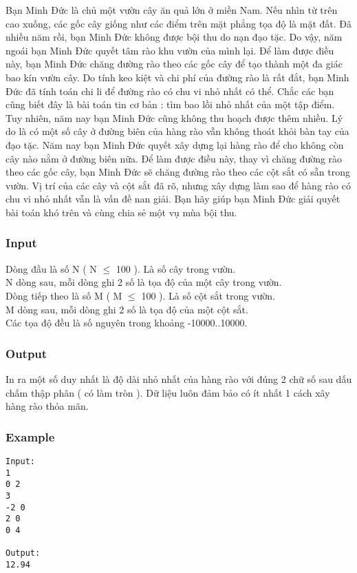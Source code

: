 



   Bạn Minh Đức là chủ một vườn cây ăn quả lớn ở miền Nam. Nếu nhìn từ trên cao xuống, các gốc cây giống như các điểm trên mặt phẳng tọa độ là mặt đất. Đã nhiều năm rồi, bạn Minh Đức không được bội thu do nạn đạo tặc. Do vậy, năm ngoái bạn Minh Đức quyết tâm rào khu vườn của mình lại. Để làm được điều này, bạn Minh Đức chăng đường rào theo các gốc cây để tạo thành một đa giác bao kín vườn cây. Do tính keo kiệt và chi phí của đường rào là rất đắt, bạn Minh Đức đã tính toán chi li để đường rào có chu vi nhỏ nhất có thể. Chắc các bạn cũng biết đây là bài toán tin cơ bản : tìm bao lồi nhỏ nhất của một tập điểm. Tuy nhiên, năm nay bạn Minh Đức cũng không thu hoạch được thêm nhiều. Lý do là có một số cây ở đường biên của hàng rào vẫn không thoát khỏi bàn tay của đạo tặc. Năm nay bạn Minh Đức quyết xây dựng lại hàng rào để cho không còn cây nào nằm ở đường biên nữa. Để làm được điều này, thay vì chăng đường rào theo các gốc cây, bạn Minh Đức sẽ chăng đường rào theo các cột sắt có sẵn trong vườn. Vị trí của các cây và cột sắt đã rõ, nhưng xây dựng làm sao để hàng rào có chu vi nhỏ nhất vẫn là vấn đề nan giải. Bạn hãy giúp bạn Minh Đức giải quyết bài toán khó trên và cùng chia sẻ một vụ mùa bội thu.  

\subsubsection{   Input  }

   Dòng đầu là số N ( N  $\le$  100 ). Là số cây trong vườn.   
\\   N dòng sau, mỗi dòng ghi 2 số là tọa độ của một cây trong vườn.   
\\   Dòng tiếp theo là số M ( M  $\le$  100 ). Là số cột sắt trong vườn.   
\\   M dòng sau, mỗi dòng ghi 2 số là tọa độ của một cột sắt.   
\\   Các tọa độ đều là số nguyên trong khoảng -10000..10000.  

\subsubsection{   Output  }

   In ra một số duy nhất là độ dài nhỏ nhất của hàng rào với đúng 2 chữ số sau dấu chấm thập phân ( có làm tròn ). Dữ liệu luôn đảm bảo có ít nhất 1 cách xây hàng rào thỏa mãn.  

\subsubsection{   Example  }
\begin{verbatim}
Input:
1
0 2
3
-2 0
2 0
0 4

Output:
12.94
\end{verbatim}
